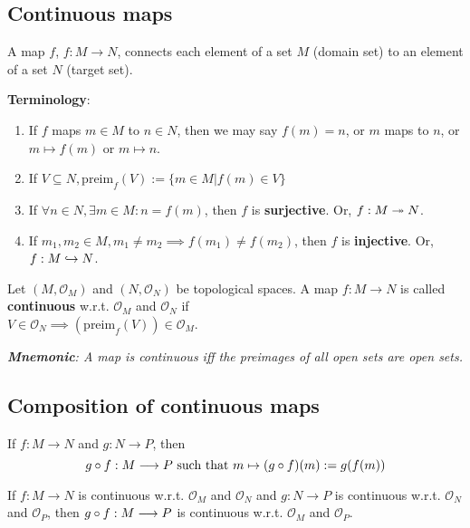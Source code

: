 \subsection{Continuous maps}
A map $f$, $f: M \to N$, connects each element of a set $M$ (domain set) to an element of a set $N$ (target set).

\textbf{Terminology}: 
\begin{enumerate}
\item If $f$ maps $m \in M$ to $n \in N$, then we may say $f(m) = n$, or $m$ maps to $n$, or $m \mapsto f(m)$ or $m \mapsto n$.
\item If $V \subseteq N, \text{preim}_{f}(V) := \lbrace m \in M | f(m) \in V \rbrace$
\item If $\forall n \in N, \exists m \in M : n = f(m)$, then $f$ is \textbf{surjective}. Or, $f : M \twoheadrightarrow N$.
\item If $m_1, m_2 \in M, m_1 \neq m_2 \implies f(m_1) \neq f(m_2)$, then $f$ is \textbf{injective}. Or, $f : M \hookrightarrow N$.
\end{enumerate}

\begin{definition}
  Let $(M , \mathcal{O}_{M})$ and $(N, \mathcal{O}_{N})$ be topological spaces. A map $f: M \to N$ is called \textbf{continuous} w.r.t. $\mathcal{O}_{M}$ and $\mathcal{O}_{N}$ if \\
   $V \in \mathcal{O}_{N} \implies (\text{preim}_{f}(V)) \in \mathcal{O}_{M}$.
\end{definition}

\textit{\textbf{Mnemonic}: A map is continuous iff the preimages of all open sets are open sets.}

\subsection{Composition of continuous maps}
\begin{definition}
If $f: M \to N$ and $g: N \to P$, then \\
\begin{equation*}
g \circ f: M \longrightarrow P \text{ such that } m \mapsto (g \circ f)(m) := g(f(m))
\end{equation*}
\end{definition}

\begin{theorem}
If $f: M \to N$ is continuous w.r.t. $\mathcal{O}_{M}$ and $\mathcal{O}_{N}$ and $g: N \to P$ is continuous w.r.t. $\mathcal{O}_{N}$ and $\mathcal{O}_{P}$, then $g \circ f: M \longrightarrow P$ is continuous w.r.t. $\mathcal{O}_{M}$ and $\mathcal{O}_{P}$.
\end{theorem}

